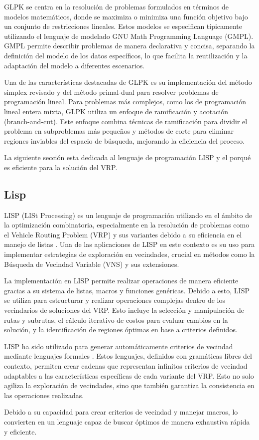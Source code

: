 \documentclass{article}
\begin{document}
GLPK se centra en la resolución de problemas formulados en términos de modelos matemáticos, donde se maximiza o minimiza una función objetivo bajo un conjunto de restricciones lineales. Estos modelos se especifican típicamente utilizando el lenguaje de modelado GNU Math Programming Language (GMPL). GMPL permite describir problemas de manera declarativa y concisa, separando la definición del modelo de los datos específicos, lo que facilita la reutilización y la adaptación del modelo a diferentes escenarios.

Una de las características destacadas de GLPK es su implementación del método simplex revisado y del método primal-dual para resolver problemas de programación lineal. Para problemas más complejos, como los de programación lineal entera mixta, GLPK utiliza un enfoque de ramificación y acotación (branch-and-cut). Este enfoque combina técnicas de ramificación para dividir el problema en subproblemas más pequeños y métodos de corte para eliminar regiones inviables del espacio de búsqueda, mejorando la eficiencia del proceso.

La siguiente sección esta dedicada al lenguaje de programación LISP y el porqué es eficiente para la solución del VRP.

\subsection{Lisp}
 LISP (LISt Processing) es un lenguaje de programación utilizado en el ámbito de la optimización combinatoria, especialmente en la resolución de problemas como el Vehicle Routing Problem (VRP) y sus variantes debido a su eficiencia en el manejo de listas \cite{ref1,ref2,ref3,ref4,ref16}. Una de las aplicaciones de LISP en este contexto es su uso para implementar estrategias de exploración en vecindades, crucial en métodos como la Búsqueda de Vecindad Variable (VNS) y sus extensiones.

La implementación en LISP permite realizar operaciones de manera eficiente gracias a su sistema de listas, macros y funciones genéricas. Debido a esto, LISP se utiliza para estructurar y realizar operaciones complejas dentro de los vecindarios de soluciones del VRP. Esto incluye la selección y manipulación de rutas y subrutas, el cálculo iterativo de costos para evaluar cambios en la solución, y la identificación de regiones óptimas en base a criterios definidos. 

LISP ha sido utilizado para generar automáticamente criterios de vecindad mediante lenguajes formales \cite{ref16}. Estos lenguajes, definidos con gramáticas libres del contexto, permiten crear cadenas que representan infinitos criterios de vecindad adaptables a las características específicas de cada variante del VRP. Esto no solo agiliza la exploración de vecindades, sino que también garantiza la consistencia en las operaciones realizadas. 

Debido a su capacidad para crear criterios de vecindad y manejar macros, lo convierten en un lenguaje capaz de buscar óptimos de manera exhaustiva rápida y eficiente.


 
\end{document}
